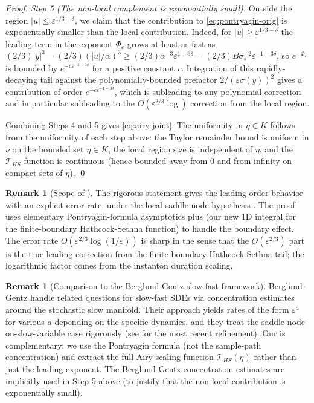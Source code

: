 \documentclass[11pt,a4paper]{article}
\theoremstyle{plain}
\theoremstyle{definition}
\newtheorem{remark}[theorem]{Remark}
\newcommand{\eps}{\varepsilon}
\begin{document}
\begin{proof}
\textit{Step 5 (The non-local complement is exponentially small).} Outside the region $|u| \leq \eps^{1/3-\delta}$, we claim that the contribution to \eqref{eq:pontryagin-orig} is exponentially smaller than the local contribution. Indeed, for $|u|\geq \eps^{1/3-\delta}$ the leading term in the exponent $\Phi_\eps$ grows at least as fast as $(2/3)|y|^3 = (2/3)(|u|/\alpha)^3 \geq (2/3)\alpha^{-3}\eps^{1-3\delta} = (2/3)B\sigma_*^{-2}\eps^{-1-3\delta}$, so $e^{-\Phi_\eps}$ is bounded by $e^{-c\eps^{-1-3\delta}}$ for a positive constant $c$. Integration of this rapidly-decaying tail against the polynomially-bounded prefactor $2/(\eps\sigma(y))^2$ gives a contribution of order $e^{-c\eps^{-1-3\delta}}$, which is subleading to any polynomial correction and in particular subleading to the $O(\eps^{2/3}\log)$ correction from the local region.

Combining Steps 4 and 5 gives \eqref{eq:airy-joint}. The uniformity in $\eta\in K$ follows from the uniformity of each step above: the Taylor remainder bound is uniform in $\nu$ on the bounded set $\eta\in K$, the local region size is independent of $\eta$, and the $\mathcal T_{HS}$ function is continuous (hence bounded away from 0 and from infinity on compact sets of $\eta$).
\qed
\end{proof}

\begin{remark}[Scope of ]
The rigorous statement gives the leading-order behavior with an explicit error rate, under the local saddle-node hypothesis . The proof uses elementary Pontryagin-formula asymptotics plus  (our new 1D integral for the finite-boundary Hathcock-Sethna function) to handle the boundary effect. The error rate $O(\eps^{2/3}\log(1/\eps))$ is sharp in the sense that the $O(\eps^{2/3})$ part is the true leading correction from the finite-boundary Hathcock-Sethna tail; the logarithmic factor comes from the instanton duration scaling.
\end{remark}

\begin{remark}[Comparison to the Berglund-Gentz slow-fast framework]
Berglund-Gentz \cite[Chapter 5]{BerglundGentz2006} handle related questions for slow-fast SDEs via concentration estimates around the stochastic slow manifold. Their approach yields rates of the form $\eps^a$ for various $a$ depending on the specific dynamics, and they treat the saddle-node-on-slow-variable case rigorously (see \cite{BergeotBerglundZogheib2025} for the most recent refinement). Our  is complementary: we use the Pontryagin formula (not the sample-path concentration) and extract the full Airy scaling function $\mathcal T_{HS}(\eta)$ rather than just the leading exponent. The Berglund-Gentz concentration estimates are implicitly used in Step 5 above (to justify that the non-local contribution is exponentially small).
\end{remark}
\end{document}
